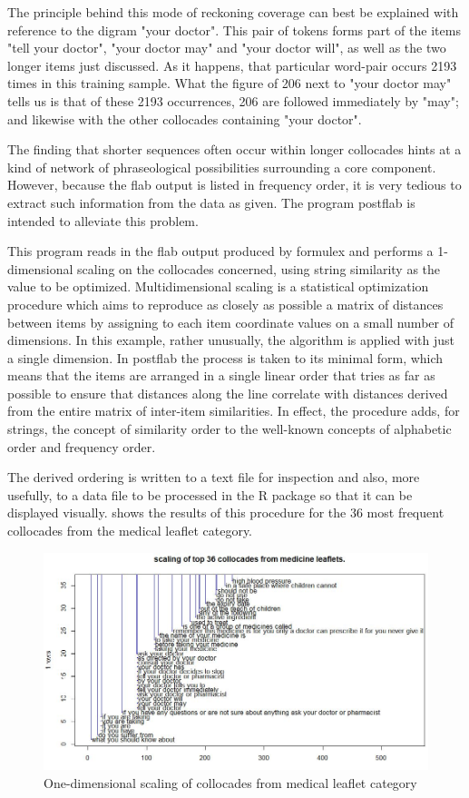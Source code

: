 \documentclass[output=paper]{langscibook}
\begin{document}
The principle behind this mode of reckoning coverage can best be explained with reference to the digram "your doctor". This pair of tokens forms part of the items "tell your doctor", "your doctor may" and "your doctor will", as well as the two longer items just discussed. As it happens, that particular word-pair occurs 2193 times in this training sample. What the figure of 206 next to "your doctor may" tells us is that of these 2193 occurrences, 206 are followed immediately by "may"; and likewise with the other collocades containing "your doctor".

The finding that shorter sequences often occur within longer collocades hints at a kind of network of phraseological possibilities surrounding a core component. However, because the flab output is listed in frequency order, it is very tedious to extract such information from the data as given. The program postflab is intended to alleviate this problem.

This program reads in the flab output produced by formulex and performs a 1-dimensional scaling on the collocades concerned, using string similarity as the value to be optimized. Multidimensional scaling \citep{UptonCook2006}  is a statistical optimization procedure which aims to reproduce as closely as possible a matrix of distances between items by assigning to each item coordinate values on a small number of dimensions. In this example, rather unusually, the algorithm is applied with just a single dimension. In postflab the process is taken to its minimal form, which means that the items are arranged in a single linear order that tries as far as possible to ensure that distances along the line correlate with distances derived from the entire matrix of inter-item similarities. In effect, the procedure adds, for strings, the concept of similarity order to the well-known concepts of alphabetic order and frequency order.

The derived ordering is written to a text file for inspection and also, more usefully, to a data file to be processed in the R package so that it can be displayed visually.  shows the results of this procedure for the 36 most frequent collocades from the medical leaflet category.

  
\begin{figure}
\includegraphics[width=\textwidth]{figures/forsyth-img005.jpg}
\caption{One-dimensional scaling of collocades from medical leaflet category}
\label{fig:forsyth:4}
\end{figure}
\end{document}
